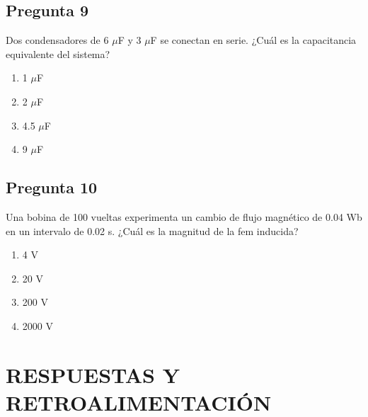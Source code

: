 \begin{preguntabox}
\subsection*{Pregunta 9}
Dos condensadores de 6 $\mu$F y 3 $\mu$F se conectan en serie. ¿Cuál es la capacitancia equivalente del sistema?

\begin{enumerate}
    \item[A)] 1 $\mu$F
    \item[B)] 2 $\mu$F
    \item[C)] 4.5 $\mu$F
    \item[D)] 9 $\mu$F
\end{enumerate}
\end{preguntabox}

\begin{preguntabox}
\subsection*{Pregunta 10}
Una bobina de 100 vueltas experimenta un cambio de flujo magnético de 0.04 Wb en un intervalo de 0.02 s. ¿Cuál es la magnitud de la fem inducida?

\begin{enumerate}
    \item[A)] 4 V
    \item[B)] 20 V
    \item[C)] 200 V
    \item[D)] 2000 V
\end{enumerate}
\end{preguntabox}

\newpage
\section*{RESPUESTAS Y RETROALIMENTACIÓN}

